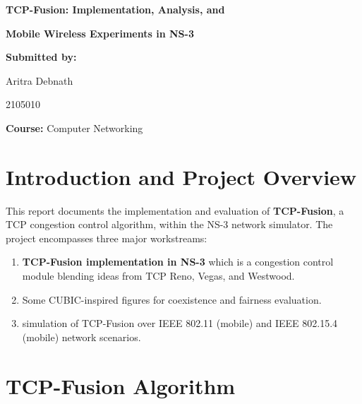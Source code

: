 \documentclass[12pt,a4paper]{article}
\begin{document}
\begin{titlepage}
    \centering
    \vspace*{2cm}
    {\LARGE \textbf{TCP-Fusion: Implementation, Analysis, and} \par}
    \vspace{0.4cm}
    {\LARGE \textbf{Mobile Wireless Experiments in NS-3} \par}
    \vspace{1.5cm}
    \vspace{3cm}
    {\large \textbf{Submitted by:} \par}
    \vspace{0.3cm}
    {\large Aritra Debnath\par}
    {\large 2105010 \par}
    \vspace{1cm}
    {\large \textbf{Course:} Computer Networking\par}
    \vspace{0.5cm}
    \vfill
\end{titlepage}

\tableofcontents
\newpage

\section{Introduction and Project Overview}

This report documents the implementation and evaluation of \textbf{TCP-Fusion}, a TCP congestion control algorithm, within the NS-3 network simulator. The project encompasses three major workstreams:

\begin{enumerate}
    \item \textbf{TCP-Fusion implementation in NS-3} which is a congestion control module blending ideas from TCP Reno, Vegas, and Westwood.
    \item Some CUBIC-inspired figures for coexistence and fairness evaluation.
    \item  simulation of TCP-Fusion over IEEE 802.11 (mobile) and IEEE 802.15.4 (mobile) network scenarios.
\end{enumerate}

\section{TCP-Fusion Algorithm}
\end{document}
